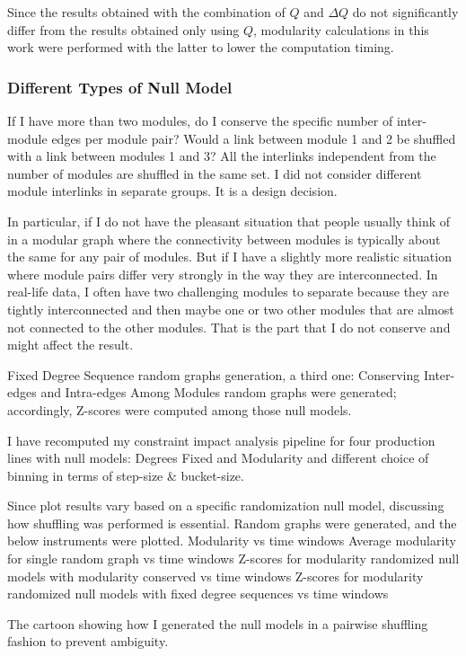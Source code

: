 Since the results obtained with the combination of $Q$ and $\Delta Q$ do not significantly differ from the results obtained only using $Q$, modularity calculations in this work were performed with the latter to lower the computation timing.
\clearpage

\subsubsection*{Different Types of Null Model}
{\color{red} If I have more than two modules, do I conserve the specific number of inter-module edges per module pair? Would a link between module 1 and 2 be shuffled with a link between modules 1 and 3? 
	All the interlinks independent from the number of modules are shuffled in the same set. I did not consider different module interlinks in separate groups. It is a design decision.
	
	In particular, if I do not have the pleasant situation that people usually think of in a modular graph where the connectivity between modules is typically about the same for any pair of modules. But if I have a slightly more realistic situation where module pairs differ very strongly in the way they are interconnected. In real-life data, I often have two challenging modules to separate because they are tightly interconnected and then maybe one or two other modules that are almost not connected to the other modules. That is the part that I do not conserve and might affect the result.
	
	Fixed Degree Sequence random graphs generation, a third one: Conserving Inter-edges and Intra-edges Among Modules random graphs were generated; accordingly, Z-scores were computed among those null models.
	
	I have recomputed my constraint impact analysis pipeline for four production lines with null models: Degrees Fixed and Modularity and different choice of binning in terms of step-size \& bucket-size.
	
	Since plot results vary based on a specific randomization null model, discussing how shuffling was performed is essential. 
	Random graphs were generated, and the below instruments were plotted.
	Modularity vs time windows
	Average modularity for single random graph vs time windows
	Z-scores for modularity randomized null models with modularity conserved vs time windows
	Z-scores for modularity randomized null models with fixed degree sequences vs time windows
	
	
	The cartoon showing how I generated the null models in a pairwise shuffling fashion to prevent ambiguity.}

